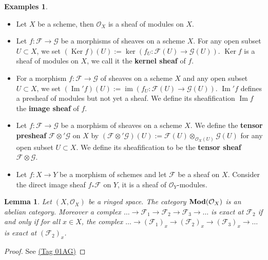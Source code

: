 \documentclass{article}
\theoremstyle{plain}
\newtheorem{lemma}[theorem]{Lemma}
\theoremstyle{definition}
\newtheorem{examples}[theorem]{Examples}
\DeclareMathOperator{\Ker}{Ker}
\DeclareMathOperator{\Imm}{Im}
\DeclareMathOperator{\im}{im}
\DeclareMathOperator{\Mod}{\bf{Mod}}
\begin{document}
\begin{examples} \textbf{ }
\begin{itemize}
    \item[$a)$] Let $X$ be a scheme, then $\mathcal{O}_X$ is a sheaf of modules on $X$.
    
    \item[$b)$]  Let $f:\mathcal{F}\rightarrow \mathcal{G}$ be a morphisms of sheaves on a scheme $X$.
    For any open subset $U\subset X$, we set 
    $(\Ker f)(U):= \ker( f_U : \mathcal{F}(U) \rightarrow \mathcal{G}(U) )$. $\Ker f$ is a sheaf of modules on $X$, we call it the \textbf{kernel sheaf} of $f$.
    
    \item[$c)$] For a morphism $f:\mathcal{F}\rightarrow \mathcal{G}$ of sheaves on a scheme $X$ and any open subset $U\subset X$, we set $(\Imm' f)(U):= \im( f_U : \mathcal{F}(U) \rightarrow\mathcal{G}(U)).$
    $\Imm' f$ defines a presheaf of modules but not yet a sheaf. We define its sheafification $\Imm f$ the \textbf{image sheaf} of $f$.

    \item[$d)$] Let $f:\mathcal{F}\rightarrow \mathcal{G}$ be a morphism of sheaves on a scheme $X$.
    We define the \textbf{tensor presheaf} $\mathcal{F}\otimes'\mathcal{G}$ on $X$ by $(\mathcal{F}\otimes'\mathcal{G})(U):= \mathcal{F}(U) \otimes_{\mathcal{O}_X(U)}\mathcal{G}(U)$ for any open subset $U\subset X$.
    We define its sheafification to be the \textbf{tensor sheaf} $\mathcal{F}\otimes \mathcal{G}$.


    \item[$e)$] Let $f:X\rightarrow Y$ be a morphism of schemes and let $\mathcal{F}$ be a sheaf on $X$. Consider the direct image sheaf $f_*\mathcal{F}$ on $Y$, it is a sheaf of $\mathcal{O}_Y$-modules.
\end{itemize} 
\end{examples}





\begin{lemma}
\label{exact_at_level_of_stalk}
    Let $(X, \mathcal{O}_X)$ be a ringed space. The category $\Mod(\mathcal{O}_X)$ is an abelian category. Moreover a complex
    $\dots \rightarrow\mathcal{F}_1\rightarrow \mathcal{F}_2 \rightarrow \mathcal{F}_3 \rightarrow\dots$ is exact at $\mathcal{F}_2$ if and only if for all $x\in X$, the complex
    $\dots \rightarrow(\mathcal{F}_1)_x\rightarrow (\mathcal{F}_2)_x \rightarrow (\mathcal{F}_3)_x \rightarrow\dots$ is exact at $(\mathcal{F}_2)_x$.
\end{lemma}
\begin{proof}
    See \cite{Stacks} \href{https://stacks.math.columbia.edu/tag/01AG}{(Tag 01AG)}
\end{proof}
   
\end{document}
